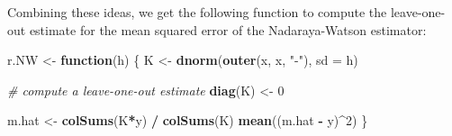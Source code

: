 \documentclass[
  a4paper,
]{article}
\newenvironment{Shaded}{\begin{snugshade}}{\end{snugshade}}
\newcommand{\AttributeTok}[1]{\textcolor[rgb]{0.13,0.29,0.53}{#1}}
\newcommand{\CommentTok}[1]{\textcolor[rgb]{0.56,0.35,0.01}{\textit{#1}}}
\newcommand{\ControlFlowTok}[1]{\textcolor[rgb]{0.13,0.29,0.53}{\textbf{#1}}}
\newcommand{\DecValTok}[1]{\textcolor[rgb]{0.00,0.00,0.81}{#1}}
\newcommand{\FunctionTok}[1]{\textcolor[rgb]{0.13,0.29,0.53}{\textbf{#1}}}
\newcommand{\NormalTok}[1]{#1}
\newcommand{\OtherTok}[1]{\textcolor[rgb]{0.56,0.35,0.01}{#1}}
\newcommand{\SpecialCharTok}[1]{\textcolor[rgb]{0.81,0.36,0.00}{\textbf{#1}}}
\newcommand{\StringTok}[1]{\textcolor[rgb]{0.31,0.60,0.02}{#1}}
\theoremstyle{definition}
\theoremstyle{definition}
\theoremstyle{definition}
\theoremstyle{definition}
\theoremstyle{remark}
\begin{document}
Combining these ideas, we get the following function
to compute the leave-one-out estimate for the mean squared error of
the Nadaraya-Watson estimator:

\begin{Shaded}
\begin{Highlighting}[]
\NormalTok{r.NW }\OtherTok{\textless{}{-}} \ControlFlowTok{function}\NormalTok{(h) \{}
\NormalTok{    K }\OtherTok{\textless{}{-}} \FunctionTok{dnorm}\NormalTok{(}\FunctionTok{outer}\NormalTok{(x, x, }\StringTok{"{-}"}\NormalTok{), }\AttributeTok{sd =}\NormalTok{ h)}

    \CommentTok{\# compute a leave{-}one{-}out estimate}
    \FunctionTok{diag}\NormalTok{(K) }\OtherTok{\textless{}{-}} \DecValTok{0}

\NormalTok{    m.hat }\OtherTok{\textless{}{-}} \FunctionTok{colSums}\NormalTok{(K}\SpecialCharTok{*}\NormalTok{y) }\SpecialCharTok{/} \FunctionTok{colSums}\NormalTok{(K)}
    \FunctionTok{mean}\NormalTok{((m.hat }\SpecialCharTok{{-}}\NormalTok{ y)}\SpecialCharTok{\^{}}\DecValTok{2}\NormalTok{)}
\NormalTok{\}}
\end{Highlighting}
\end{Shaded}
\end{document}
